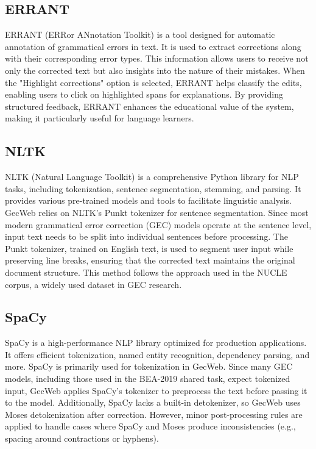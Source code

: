 \subsection{ERRANT}

ERRANT (ERRor ANnotation Toolkit) is a tool designed for automatic annotation of grammatical errors in text.
It is used to extract corrections along with their corresponding error types.
This information allows users to receive not only the corrected text but also insights into the nature of their mistakes.
When the "Highlight corrections" option is selected, ERRANT helps classify the edits, enabling users to click on highlighted spans for explanations.
By providing structured feedback, ERRANT enhances the educational value of the system, making it particularly useful for language learners.

\subsection{NLTK}

NLTK (Natural Language Toolkit) is a comprehensive Python library for NLP tasks, including tokenization, sentence segmentation, stemming, and parsing.
It provides various pre-trained models and tools to facilitate linguistic analysis.
GecWeb relies on NLTK's Punkt tokenizer for sentence segmentation.
Since most modern grammatical error correction (GEC) models operate at the sentence level, input text needs to be split into individual sentences before processing.
The Punkt tokenizer, trained on English text, is used to segment user input while preserving line breaks, ensuring that the corrected text maintains the original document structure.
This method follows the approach used in the NUCLE corpus, a widely used dataset in GEC research.

\subsection{SpaCy}

SpaCy is a high-performance NLP library optimized for production applications.
It offers efficient tokenization, named entity recognition, dependency parsing, and more.
SpaCy is primarily used for tokenization in GecWeb.
Since many GEC models, including those used in the BEA-2019 shared task, expect tokenized input, GecWeb applies SpaCy's tokenizer to preprocess the text before passing it to the model.
Additionally, SpaCy lacks a built-in detokenizer, so GecWeb uses Moses detokenization after correction.
However, minor post-processing rules are applied to handle cases where SpaCy and Moses produce inconsistencies (e.g., spacing around contractions or hyphens).

